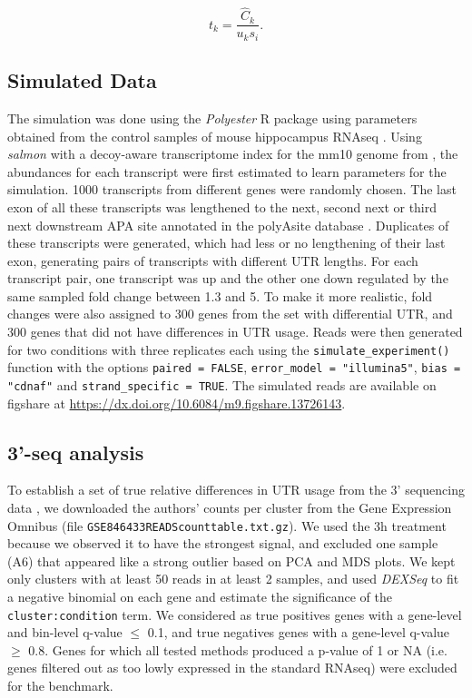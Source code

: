 \documentclass{bmcart}
\begin{document}
\begin{equation}
    t_{k} =\frac{\hat{C}_{k}}{u_{k}s_{i}}.
\end{equation}

\subsection{Simulated Data}
\label{sec:sim}
The simulation was done using the \textit{Polyester} R package  \cite{Frazee2015Polyester:Expression} using parameters obtained from the control samples of mouse hippocampus RNAseq \cite{Fontes2017Activity-DependentPotentiation}. Using \textit{salmon} \cite{PatroSalmon2017} with a decoy-aware transcriptome index for the mm10 genome from \cite{Stolarczyk2020Refgenie:Manager}, the abundances for each transcript were first estimated to learn parameters for the simulation. 1000 transcripts from different genes were randomly chosen. The last exon of all these transcripts was lengthened to the next, second next or third next downstream APA site annotated in the polyAsite database \cite{Herrmann2020PolyASiteSequencing}. Duplicates of these transcripts were generated, which had less or no lengthening of their last exon, generating pairs of transcripts with different UTR lengths. For each transcript pair, one transcript was up and the other one down regulated by the same sampled fold change between 1.3 and 5. To make it more realistic, fold changes were also assigned to 300 genes from the set with differential UTR, and 300 genes that did not have differences in UTR usage. Reads were then generated for two conditions with three replicates each using the \texttt{simulate\_experiment()} function with the options \texttt{paired = FALSE},  \texttt{error\_model = "illumina5"}, 
\texttt{bias = "cdnaf"} and \texttt{strand\_specific = TRUE}. The simulated reads are available on figshare at \url{https://dx.doi.org/10.6084/m9.figshare.13726143}.

\subsection{3'-seq analysis}

To establish a set of true relative differences in UTR usage from the 3' sequencing data \cite{Fontes2017Activity-DependentPotentiation}, we downloaded the authors' counts per cluster from the Gene Expression Omnibus (file \texttt{GSE84643\textunderscore 3READS\textunderscore count\textunderscore table.txt.gz}). We used the 3h treatment because we observed it to have the strongest signal, and excluded one sample (A6) that appeared like a strong outlier based on PCA and MDS plots. We kept only clusters with at least 50 reads in at least 2 samples, and used \textit{DEXSeq} to fit a negative binomial on each gene and estimate the significance of the \texttt{cluster:condition} term. We considered as true positives genes with a gene-level and bin-level q-value $\leq$ 0.1, and true negatives genes with a gene-level q-value $\geq$ 0.8. Genes for which all tested methods produced a p-value of 1 or NA (i.e. genes filtered out as too lowly expressed in the standard RNAseq) were excluded for the benchmark.
\end{document}
